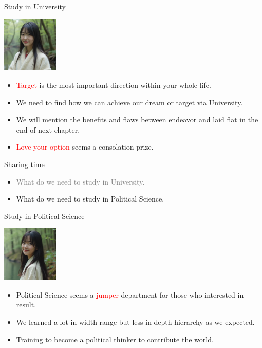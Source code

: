 \documentclass{beamer}
\begin{document}
\begin{frame}{Study in University}
\begin{center}
\includegraphics[width=0.2\textwidth]{target.png}
\end{center}
\begin{itemize}
\item \textcolor{red}{Target} is the most important direction within your whole life.
\item We need to find how we can achieve our dream or target via University.
\item We will mention the benefits and flaws between endeavor and laid flat in the end of next chapter.
\item \textcolor{red}{Love your option} seems a consolation prize.
\end{itemize}
\end{frame}
\begin{frame}{Sharing time}
\begin{itemize}
\item \textcolor{gray}{What do we need to study in University.}
\item What do we need to study in Political Science.
\end{itemize}
\end{frame}
\begin{frame}{Study in Political Science}
\begin{center}
\includegraphics[width=0.2\textwidth]{motivate.png}
\end{center}
\begin{itemize}
\item Political Science seems a \textcolor{red}{jumper} department for those who interested in result.
\item We learned a lot in width range but less in depth hierarchy as we expected.
\item Training to become a political thinker to contribute the world.
\end{itemize}
\end{frame}
\end{document}
